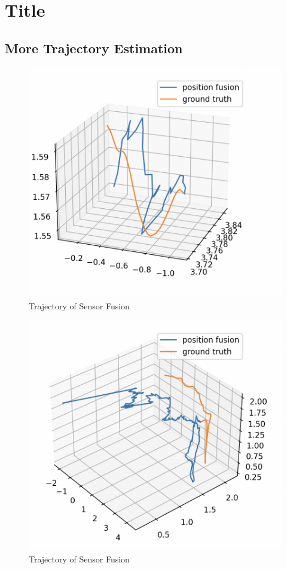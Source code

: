 \chapter{Title}
\section{More Trajectory Estimation}
\begin{figure}[H]
    \centering
    \includegraphics[width=.6\linewidth]{Pictures/sensor_fusion/2425_1s_test.png}
    \caption{Trajectory of Sensor Fusion}
    \label{fig:sensor_fusion_1}
\end{figure}

\begin{figure}[H]
    \centering
    \includegraphics[width=.6\linewidth]{Pictures/sensor_fusion/10s_test.png}
    \caption{Trajectory of Sensor Fusion}
    \label{fig:sensor_fusion_2}
\end{figure}

\clearpage
